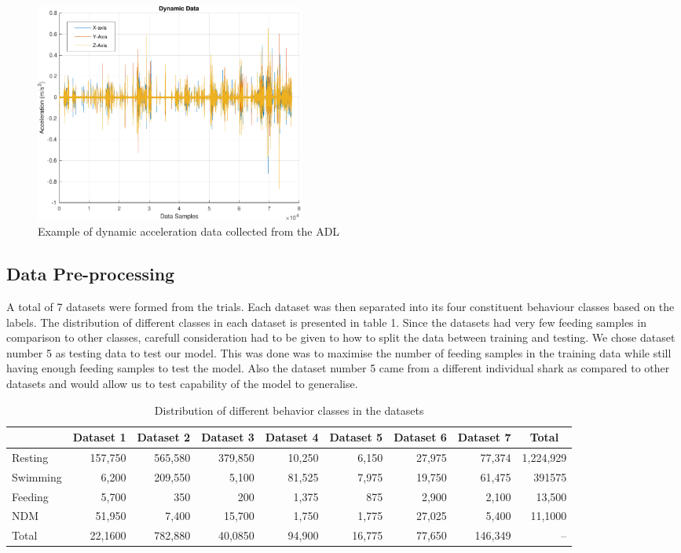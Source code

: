 \documentclass[conference]{IEEEtran}
\begin{document}
\begin{figure}[h]
	\centering
	\includegraphics[width=3.49in]{2_dynamic.pdf}
	\caption{Example of dynamic acceleration data collected from the ADL}
	\label{dynamic}
\end{figure}

\subsection{Data Pre-processing}
A total of 7 datasets were formed from the trials. Each dataset was then separated into its four constituent behaviour classes based on the labels. The distribution of different classes in each dataset is presented in table 1. Since the datasets had very few feeding samples in comparison to other classes, carefull consideration had to be given to how to split the data between training and testing. We chose dataset number 5 as testing data to test our model. This was done was to maximise the number of feeding samples in the training data while still having enough feeding samples to test the model. Also the dataset number 5 came from a different individual shark as compared to other datasets and would allow us to test capability of the model to generalise.

\begin{table}[tp!]
	\centering
	\caption{Distribution of different behavior classes in the datasets}
	\begin{tabular}{l r r r r r r r r}
	\hline
	& \textbf{Dataset 1} & \textbf{Dataset 2} & \textbf{Dataset 3} & \textbf{Dataset 4} & \textbf{Dataset 5} & \textbf{Dataset 6} & \textbf{Dataset 7} & \multicolumn{1}{c}{\textbf{Total}}\\
	\hline
	Resting & 157,750 & 565,580 & 379,850 & 10,250 & 6,150 & 27,975 & 77,374 & 1,224,929 \\
	Swimming & 6,200 & 209,550 & 5,100 & 81,525 & 7,975 & 19,750 & 61,475 & 391575 \\
	Feeding & 5,700 & 350 & 200 & 1,375 & 875 & 2,900 & 2,100 & 13,500 \\
	NDM & 51,950 & 7,400 & 15,700 & 1,750 & 1,775 & 27,025 & 5,400 & 11,1000 \\
	Total & 22,1600 & 782,880 & 40,0850 & 94,900 & 16,775 & 77,650 & 146,349 & -- \\
	\hline
	\end{tabular}
	\label{}
\end{table}
\end{document}
